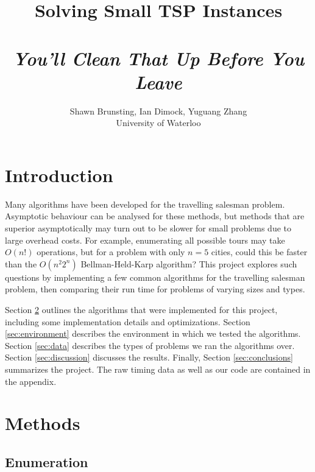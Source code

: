 \documentclass[11pt]{article}
\begin{document}
	
	\thispagestyle{empty}
	
	\title{Solving Small TSP Instances \\ ~ \\ \textit{You'll Clean That Up Before You Leave}}
	
	\author{Shawn Brunsting, Ian Dimock, Yuguang Zhang \\ University of Waterloo}
	
	\maketitle
	
	
	\section{Introduction}
	
	Many algorithms have been developed for the travelling salesman problem. Asymptotic behaviour can be analysed for these methods, but methods that are superior asymptotically may turn out to be slower for small problems due to large overhead costs. For example, enumerating all possible tours may take $O(n!)$ operations, but for a problem with only $n=5$ cities, could this be faster than the $O(n^2 2^n)$ Bellman-Held-Karp algorithm? This project explores such questions by implementing a few common algorithms for the travelling salesman problem, then comparing their run time for problems of varying sizes and types.
	
	Section \ref{sec:methods} outlines the algorithms that were implemented for this project, including some implementation details and optimizations. Section \ref{sec:environment} describes the environment in which we tested the algorithms. Section \ref{sec:data} describes the types of problems we ran the algorithms over. Section \ref{sec:discussion} discusses the results. Finally, Section \ref{sec:conclusions} summarizes the project. The raw timing data as well as our code are contained in the appendix.
	
	\section{Methods}
	\label{sec:methods}
	
	\subsection{Enumeration}
	
\end{document}
